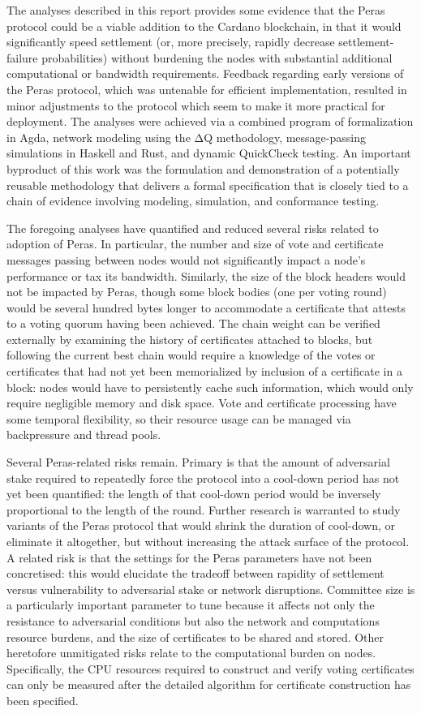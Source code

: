 \documentclass[10pt]{article}
\begin{document}
The analyses described in this report provides some evidence that the
Peras protocol could be a viable addition to the Cardano blockchain, in
that it would significantly speed settlement (or, more precisely,
rapidly decrease settlement-failure probabilities) without burdening the
nodes with substantial additional computational or bandwidth
requirements. Feedback regarding early versions of the Peras protocol,
which was untenable for efficient implementation, resulted in minor
adjustments to the protocol which seem to make it more practical for
deployment. The analyses were achieved via a combined program of
formalization in Agda, network modeling using the ΔQ methodology,
message-passing simulations in Haskell and Rust, and dynamic QuickCheck
testing. An important byproduct of this work was the formulation and
demonstration of a potentially reusable methodology that delivers a
formal specification that is closely tied to a chain of evidence
involving modeling, simulation, and conformance testing.

The foregoing analyses have quantified and reduced several risks related
to adoption of Peras. In particular, the number and size of vote and
certificate messages passing between nodes would not significantly
impact a node's performance or tax its bandwidth. Similarly, the size of
the block headers would not be impacted by Peras, though some block
bodies (one per voting round) would be several hundred bytes longer to
accommodate a certificate that attests to a voting quorum having been
achieved. The chain weight can be verified externally by examining the
history of certificates attached to blocks, but following the current
best chain would require a knowledge of the votes or certificates that
had not yet been memorialized by inclusion of a certificate in a block:
nodes would have to persistently cache such information, which would
only require negligible memory and disk space. Vote and certificate
processing have some temporal flexibility, so their resource usage can
be managed via backpressure and thread pools.

Several Peras-related risks remain. Primary is that the amount of
adversarial stake required to repeatedly force the protocol into a
cool-down period has not yet been quantified: the length of that
cool-down period would be inversely proportional to the length of the
round. Further research is warranted to study variants of the Peras
protocol that would shrink the duration of cool-down, or eliminate it
altogether, but without increasing the attack surface of the protocol. A
related risk is that the settings for the Peras parameters have not been
concretised: this would elucidate the tradeoff between rapidity of
settlement versus vulnerability to adversarial stake or network
disruptions. Committee size is a particularly important parameter to
tune because it affects not only the resistance to adversarial
conditions but also the network and computations resource burdens, and
the size of certificates to be shared and stored. Other heretofore
unmitigated risks relate to the computational burden on nodes.
Specifically, the CPU resources required to construct and verify voting
certificates can only be measured after the detailed algorithm for
certificate construction has been specified.
\end{document}
